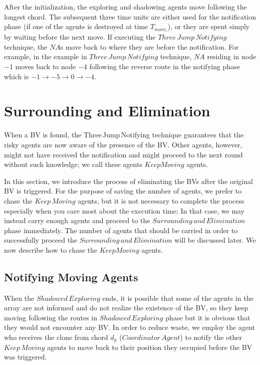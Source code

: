 
After the initialization, the exploring and shadowing agents move   following the longest chord. The subsequent three time units are either used for the notification phase (if one of the agents is destroyed at  time $T_{move_i}$), or they are spent simply by waiting before the next move.
If  executing the $Three\,Jump\,Notifying$ technique,  the $NA$s move  back to where they are before the notification. For example, in the example in $Three\,Jump\,Notifying$ technique, $NA$ residing in node $-1$ moves back to node $-4$ following the reverse route in the notifying phase which is $-1{\rightarrow}-5{\rightarrow}0{\rightarrow}-4$. 

\section{Surrounding and Elimination}
 When a BV is found,  the Three\,Jump\,Notifying technique   guarantees that the risky agents are now aware of the presence of the BV. Other agents, however, might not have received the notification and might proceed to the next round without such knowledge; we call these agents $KeepMoving$ agents.   

In this section, we introduce the process of eliminating the BVs after the original BV is triggered. For the purpose of saving the number of agents, we prefer to chase the $Keep\,Moving$ agents, but it is not necessary to complete the process especially when you care most about the  execution time; In that case, we may  instead  carry enough agents  and  proceed to the $Surrounding\,and\,Elimination$ phase immediately. 
The number of agents that should be carried in order to successfully proceed the $Surrounding\,and\,Elimination$ will be discussed later.  We now describe how to chase the $KeepMoving$ agents.

\subsection{Notifying Moving Agents}


When the $Shadowed\,Exploring$ ends, it is possible that some of the agents in the array are not informed and do not realize the existence of the BV, so they keep moving following the routes in $Shadowed\,Exploring$  phase but it is obvious that they would not encounter any BV. In order to reduce waste, we employ the agent who receives the clone from chord $d_k$ ($Coordinator\,Agent$) to notify the other $Keep\,Moving$ agents to move back to their   position  they occupied before the BV was triggered.

